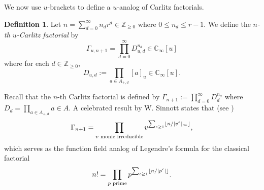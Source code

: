 \documentclass[12pt,reqno]{amsart}
\numberwithin{equation}{section}
\theoremstyle{plain}
\theoremstyle{definition}
\newtheorem{df}[thm]{Definition}
\theoremstyle{remark}
\newcommand{\ZZ}{\mathbb{Z}}
\newcommand{\CC}{\mathbb{C}}
\DeclarePairedDelimiter\floor{\lfloor}{\rfloor}
\begin{document}
We now use $u$-brackets to define a $u$-analog of Carlitz factorials.
\begin{df}\label{df-u-factorial}
    Let $n=\sum_{d=0}^\infty n_dr^d\in\ZZ_{\geq 0}$ where $0\leq n_d\leq r-1$. We define the \textit{$n$-th $u$-Carlitz factorial} by
    $$
    \Gamma_{u,n+1}=\prod_{d=0}^\infty D_{u,d}^{n_d}\in\CC_\infty[u]
    $$
    where for each $d\in\ZZ_{\geq 0}$,
    $$
    D_{u,d}:=\prod_{a\in A_{+,d}}[a]_u\in\CC_\infty[u].
    $$
\end{df}

Recall that the $n$-th Carlitz factorial is defined by 
$\Gamma_{n+1}:=\prod_{d=0}^\infty D_d^{n_d}$
where
$
D_d=\prod_{a\in A_{+,d}}a\in A
$.
A celebrated result by W. Sinnott states that (see \cite[Theorem 9.1.1]{Goss1996})
\begin{equation}\label{eq-Sinnott's identity}
    \Gamma_{n+1}=\prod_{v \text{ monic irreducible}}v^{\sum_{e\geq 1}\floor{n/|v^e|_\infty}},
\end{equation}
which serves as the function field analog of Legendre's formula for the classical factorial
$$
n!=\prod_{p\text{ prime}}p^{\sum_{e\geq 1}\floor{n/|p^e|}}.
$$
\end{document}
